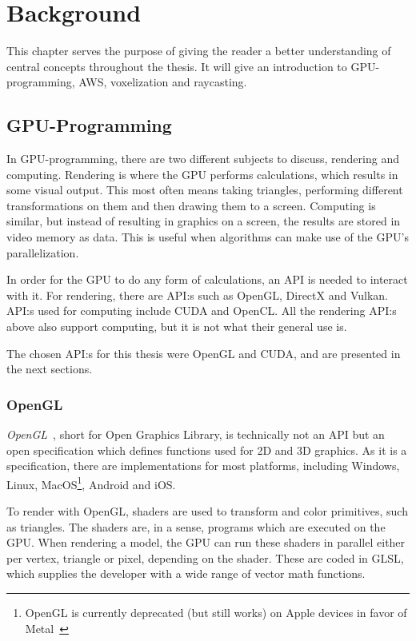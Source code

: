 \chapter{Background}\label{cha:theory}
This chapter serves the purpose of giving the reader a better understanding of central concepts throughout the thesis.
It will give an introduction to GPU-programming, AWS, voxelization and raycasting.

\section{GPU-Programming}
In GPU-programming, there are two different subjects to discuss, rendering and computing.
Rendering is where the GPU performs calculations, which results in some visual output.
This most often means taking triangles, performing different transformations on them and then drawing them to a screen.
Computing is similar, but instead of resulting in graphics on a screen, the results are stored in video memory as data.
This is useful when algorithms can make use of the GPU's parallelization.

In order for the GPU to do any form of calculations, an API is needed to interact with it.
For rendering, there are API:s such as OpenGL, DirectX and Vulkan.
API:s used for computing include CUDA and OpenCL.
All the rendering API:s above also support computing, but it is not what their general use is.

The chosen API:s for this thesis were OpenGL and CUDA, and are presented in the next sections.

\newpage

\subsection{OpenGL}
\textit{OpenGL}~\cite{opengl-about}, short for Open Graphics Library, is technically not an API but an open specification which defines functions used for 2D and 3D graphics.
As it is a specification, there are implementations for most platforms, including Windows, Linux, MacOS\footnote{OpenGL is currently deprecated (but still works) on Apple devices in favor of Metal~\cite{macos-opengl,ios-opengl}\label{fn:apple-depricated}}, Android and iOS.

To render with OpenGL, shaders are used to transform and color primitives, such as triangles.
The shaders are, in a sense, programs which are executed on the GPU.
When rendering a model, the GPU can run these shaders in parallel either per vertex, triangle or pixel, depending on the shader.
These are coded in GLSL, which supplies the developer with a wide range of vector math functions. 


